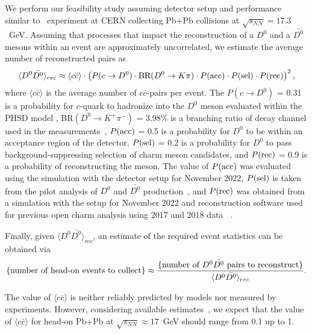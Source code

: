 \documentclass[floatfix,superscriptaddress,a4paper,
               showpieces,showkeys,nofootinbib,preprint]{revtex4-2}
\begin{document}
We perform our feasibility study assuming detector setup and performance similar to \NASixtyOne\ experiment at CERN collecting Pb+Pb collisions at $\sqrt{s_{NN}} = 17.3$~GeV. Assuming that processes that impact the reconstruction of a $D^0$ and a $\bar{D^0}$ mesons within an event are approximately uncorrelated, we estimate the average number of reconstructed pairs as
\begin{equation} \label{eq:avgD0D0yield}
    \langle D^0\bar{D^0} \rangle_{rec} \approx
        \langle c\bar{c} \rangle \cdot
        \left(
            P(c \rightarrow D^0) \cdot
            \textnormal{BR}(D^0 \rightarrow K \pi) \cdot
            P(\textnormal{acc}) \cdot
            P(\textnormal{sel}) \cdot
            P(\textnormal{rec})
        \right)^2,
\end{equation}
where $\langle c\bar{c} \rangle$ is the average number of $c\bar{c}$-pairs per event. The $P(c \rightarrow D^0)$ =  0.31 is a probability for $c$-quark to hadronize into the $D^0$ meson evaluated within the PHSD model \cite{Cassing_2009}, BR$(D^0 \rightarrow K^+ \pi^-)$ =  3.98\% is a branching ratio of decay channel used in the measurements~\cite{Workman:2022ynf}, $P(\textnormal{acc})$ = 0.5 is a probability for $D^0$ to be within an acceptance region of the detector, $P(\textnormal{sel})$ = 0.2 is a probability for $D^0$ to pass background-suppressing selection of charm meson candidates, and $P(\textnormal{rec})$ = 0.9 is a probability of reconstructing the meson.
The value of $P(\textnormal{acc})$ was evaluated using the \GeantFour simulation with the detector setup for November 2022, $P(\textnormal{sel})$ is taken from the pilot analysis of $D^0$ and $\bar{D^0}$ production~\cite{Merzlaya:2771816}, and $P(\textnormal{rec})$ was obtained from a \GeantFour simulation with the setup for November 2022 and reconstruction software used for previous open charm analysis using 2017 and 2018 data ~\cite{mbajda, Merzlaya:2771816}.



Finally, given $\langle D^0\bar{D^0} \rangle_{rec}$, an estimate of the required event statistics can be obtained via
\begin{equation} \label{eq:nevents}
    \{\textnormal{number of head-on events to collect}\} \approx
        \frac{\{\textnormal{number of $D^0\bar{D^0}$ pairs to reconstruct}\}}
             {\langle D^0\bar{D^0} \rangle_{rec}}.
\end{equation}


The value of $\langle c\bar{c} \rangle$ is neither reliably predicted by models nor measured by experiments. However, considering available estimates~\cite{Snoch:2018nnj}, we expect that the value of $\langle c\bar{c} \rangle$ for head-on Pb+Pb at $\sqrt{s_{NN}} \approx 17$~GeV should range from  0.1 up to 1. 
\end{document}
